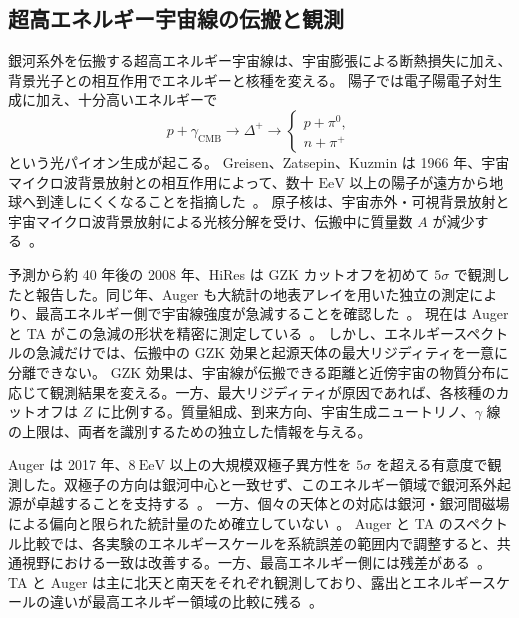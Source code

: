 \documentclass[book,paper=a4,fontsize=11pt]{jlreq}
\begin{document}
\subsection{超高エネルギー宇宙線の伝搬と観測}\label{subsec:uhecr_propagation}
銀河系外を伝搬する超高エネルギー宇宙線は、宇宙膨張による断熱損失に加え、背景光子との相互作用でエネルギーと核種を変える。
陽子では電子陽電子対生成に加え、十分高いエネルギーで
\begin{equation}
  p+\gamma_{\mathrm{CMB}}\longrightarrow \Delta^+\longrightarrow
  \begin{cases}
    p+\pi^0,\\
    n+\pi^+
  \end{cases}
\end{equation}
という光パイオン生成が起こる。
Greisen、Zatsepin、Kuzmin は 1966 年、宇宙マイクロ波背景放射との相互作用によって、数十 \(\mathrm{EeV}\) 以上の陽子が遠方から地球へ到達しにくくなることを指摘した~\cite{Greisen1966,ZatsepinKuzmin1966}。
原子核は、宇宙赤外・可視背景放射と宇宙マイクロ波背景放射による光核分解を受け、伝搬中に質量数 \(A\) が減少する~\cite{KoteraOlinto2011}。

予測から約 40 年後の 2008 年、HiRes は GZK カットオフを初めて \(5\sigma\) で観測したと報告した。同じ年、Auger も大統計の地表アレイを用いた独立の測定により、最高エネルギー側で宇宙線強度が急減することを確認した~\cite{HiResGZK2008,AugerSuppression2008}。
現在は Auger と TA がこの急減の形状を精密に測定している~\cite{AugerSpectrum2020,AugerTAEnergyScale2019,PDGCosmicRays}。
しかし、エネルギースペクトルの急減だけでは、伝搬中の GZK 効果と起源天体の最大リジディティを一意に分離できない。
GZK 効果は、宇宙線が伝搬できる距離と近傍宇宙の物質分布に応じて観測結果を変える。一方、最大リジディティが原因であれば、各核種のカットオフは \(Z\) に比例する。質量組成、到来方向、宇宙生成ニュートリノ、\(\gamma\) 線の上限は、両者を識別するための独立した情報を与える。

Auger は 2017 年、\(8\ \mathrm{EeV}\) 以上の大規模双極子異方性を \(5\sigma\) を超える有意度で観測した。双極子の方向は銀河中心と一致せず、このエネルギー領域で銀河系外起源が卓越することを支持する~\cite{AugerDipole2017}。
一方、個々の天体との対応は銀河・銀河間磁場による偏向と限られた統計量のため確立していない~\cite{AugerTA2023ArrivalDirections}。
Auger と TA のスペクトル比較では、各実験のエネルギースケールを系統誤差の範囲内で調整すると、共通視野における一致は改善する。一方、最高エネルギー側には残差がある~\cite{AugerTAEnergyScale2019}。
TA と Auger は主に北天と南天をそれぞれ観測しており、露出とエネルギースケールの違いが最高エネルギー領域の比較に残る~\cite{AugerTAEnergyScale2019}。
\end{document}
